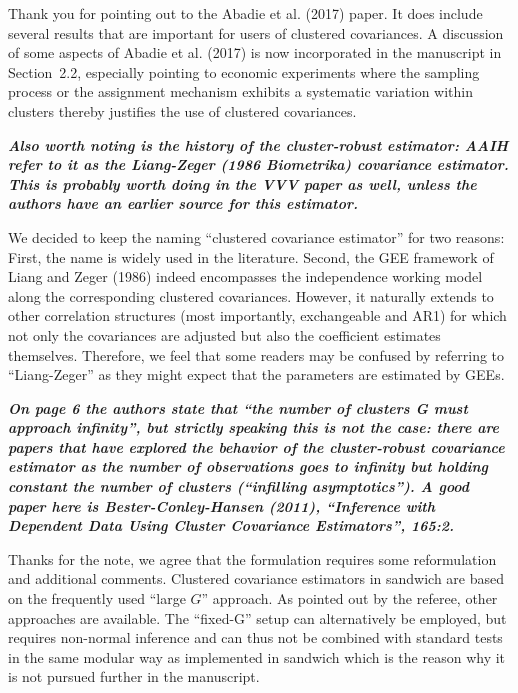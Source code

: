 \documentclass[10pt,a4paper]{article}
\begin{document}
\medskip

Thank you for pointing out to the Abadie et al. (2017) paper. It does include several results that are important for users of clustered covariances. 
A discussion of some aspects of Abadie et al. (2017) is now incorporated in the manuscript in Section~2.2, especially pointing to economic experiments where the sampling process or the assignment mechanism exhibits a systematic variation within clusters thereby justifies the use of clustered covariances.


\medskip

\textbf{\textit{Also worth noting is the history of the cluster-robust estimator: AAIH refer to it as the Liang-Zeger (1986 Biometrika) covariance estimator.  This is probably worth doing in the VVV paper as well, unless the authors have an earlier source for this estimator.
}}

\medskip

We decided to keep the naming ``clustered covariance estimator'' for two reasons:
First, the name is widely used in the literature.
Second, the GEE framework of Liang and Zeger (1986) indeed encompasses the independence
working model along the corresponding clustered covariances. However, it naturally extends
to other correlation structures (most importantly, exchangeable and AR1) for which not
only the covariances are adjusted but also the coefficient estimates themselves. Therefore,
we feel that some readers may be confused by referring to ``Liang-Zeger'' as they might
expect that the parameters are estimated by GEEs.

\medskip

\textbf{\textit{On page 6 the authors state that ``the number of clusters G must approach infinity'', but strictly speaking this is not the case: there are papers that have explored the behavior of the cluster-robust covariance estimator as the number of observations goes to infinity but holding constant the number of clusters (``infilling asymptotics'').  A good paper here is Bester-Conley-Hansen (2011), ``Inference with Dependent Data Using Cluster Covariance Estimators'', 165:2.
}}

\medskip

Thanks for the note, we agree that the formulation requires some reformulation and additional comments. Clustered covariance estimators in sandwich are based on the frequently used ``large $G$'' approach. As pointed out by the referee, other approaches are available. The ``fixed-G'' setup can alternatively be employed, but requires non-normal inference and can thus not be combined with standard tests in the same modular way as implemented in sandwich which is the reason why it is not pursued further in the manuscript.
\end{document}

